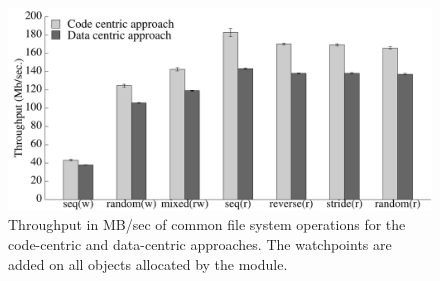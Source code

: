 

\begin{figure}[t]
\begin{center}
\includegraphics[width=6.0in]{thesis_data_code.pdf}
\end{center}
\caption[Performance impact of Data centric Vs Code centric instrumentation.]{\label{fig:watchpoint_performance}Throughput in MB/sec of common file system operations for the code-centric and data-centric approaches. The watchpoints are added on all objects allocated by the module.}
\end{figure}

